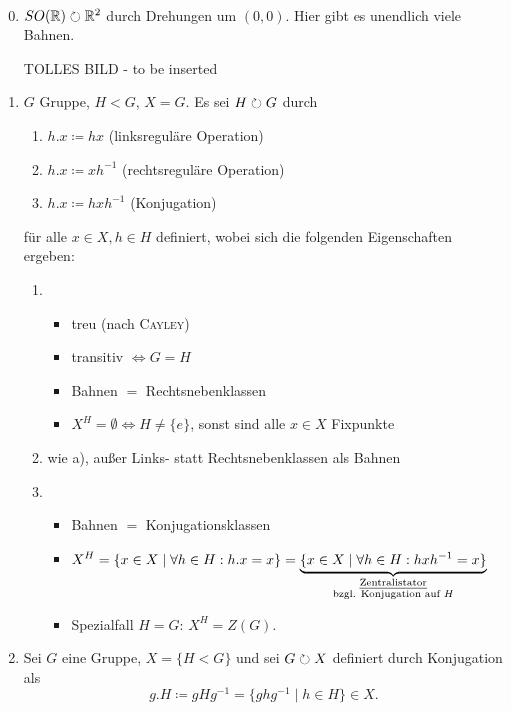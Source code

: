 \documentclass[12pt,a4paper]{scrartcl}
\begin{document}
\begin{bsp}~
	\begin{enumerate}
		\setcounter{enumi}{-1}
		\item $SO(\mathbb R) \circlearrowright \mathbb R^2$ durch Drehungen um $(0,0)$. Hier gibt es unendlich viele Bahnen.
		\begin{center}
			TOLLES BILD -  to be inserted
		\end{center}
		\item $G$ Gruppe, $H<G$, $X = G$. Es sei $H \circlearrowright G$ durch
		\begin{enumerate}[label=\alph*)]
			\item $h.x\coloneqq hx$ (linksreguläre Operation)
			\item $h.x\coloneqq xh^{-1}$ (rechtsreguläre Operation)
			\item $h.x\coloneqq hxh^{-1}$ (Konjugation)
		\end{enumerate}
		für alle $x\in X, h \in H$ definiert, wobei sich die folgenden Eigenschaften ergeben:
		\begin{enumerate}[label=\alph*)]
			\item \begin{itemize}[itemsep=-3pt]
				\item treu (nach \textsc{Cayley})
				\item transitiv $\Leftrightarrow G = H$
				\item Bahnen $=$ Rechtsnebenklassen
				\item $X^H = \emptyset \Leftrightarrow H \neq \{e\}$, sonst sind alle $x \in X$ Fixpunkte
			\end{itemize}
			\item wie a), außer Links- statt Rechtsnebenklassen als Bahnen
			\item \begin{itemize}[itemsep=-3pt]
				\item Bahnen $=$ Konjugationsklassen
				\item ${\displaystyle X^H = \{x \in X \mid \forall h \in H: h.x = x \} = \underbrace{\{x \in X \mid \forall h \in H: hxh^{-1} = x \}}_{\substack{\text{\emph{Zentralistator}}\\\text{bzgl. Konjugation auf }H}}}$
				\item Spezialfall $H=G$: $X^H = Z(G)$.
			\end{itemize}
		\end{enumerate}
		\item Sei $G$ eine Gruppe, $X = \{H < G \}$ und sei $G \circlearrowright X$ definiert durch Konjugation als \[ g.H \coloneqq gHg^{-1} = \{ ghg^{-1} \mid h \in H \} \in X. \]

\end{enumerate}
\end{bsp}
\end{document}
